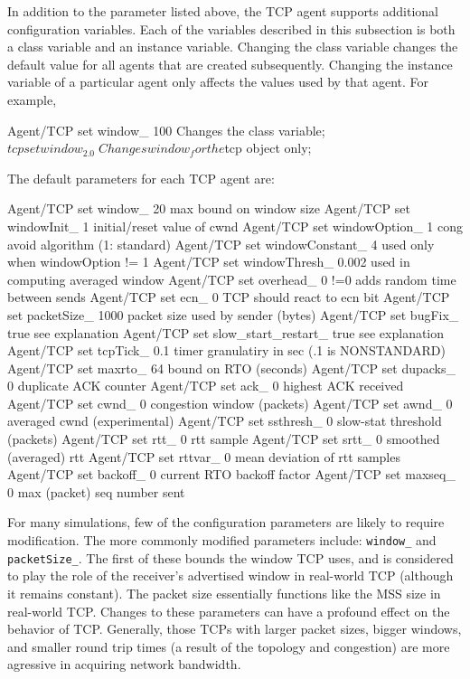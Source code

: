 \documentclass{article}
\begin{document}
In addition to the  parameter listed above,
the TCP agent supports additional configuration variables.
Each of the variables described in this subsection is
both a class variable and an instance variable.
Changing the class variable changes the default value
for all agents that are created subsequently.
Changing the instance variable of a particular agent
only affects the values used by that agent.
For example,
\begin{program}
  \>Agent/TCP set window_ 100     \; Changes the class variable;
  \>$tcp set window_ 2.0          \; Changes window_ for the $tcp object only;
\end{program}

The default parameters for each TCP agent are:
\begin{program}
Agent/TCP set window_   20              \; max bound on window size
Agent/TCP set windowInit_ 1             \; initial/reset value of cwnd
Agent/TCP set windowOption_ 1           \; cong avoid algorithm (1: standard)
Agent/TCP set windowConstant_ 4         \; used only when windowOption != 1
Agent/TCP set windowThresh_ 0.002       \; used in computing averaged window
Agent/TCP set overhead_ 0               \; !=0 adds random time between sends
Agent/TCP set ecn_ 0                    \; TCP should react to ecn bit 
Agent/TCP set packetSize_ 1000          \; packet size used by sender (bytes)
Agent/TCP set bugFix_ true              \; see explanation
Agent/TCP set slow_start_restart_ true  \; see explanation
Agent/TCP set tcpTick_ 0.1              \; timer granulatiry in sec (.1 is NONSTANDARD)
Agent/TCP set maxrto_ 64                \; bound on RTO (seconds)
Agent/TCP set dupacks_ 0                \; duplicate ACK counter
Agent/TCP set ack_ 0                    \; highest ACK received
Agent/TCP set cwnd_ 0                   \; congestion window (packets)
Agent/TCP set awnd_ 0                   \; averaged cwnd (experimental)
Agent/TCP set ssthresh_ 0               \; slow-stat threshold (packets)
Agent/TCP set rtt_ 0                    \; rtt sample
Agent/TCP set srtt_ 0                   \; smoothed (averaged) rtt
Agent/TCP set rttvar_ 0                 \; mean deviation of rtt samples
Agent/TCP set backoff_ 0                \; current RTO backoff factor
Agent/TCP set maxseq_ 0                 \; max (packet) seq number sent

\end{program}

For many simulations, few of the configuration parameters are likely
to require modification.
The more commonly modified parameters include: {\tt window\_} and
{\tt packetSize\_}.
The first of these bounds the window TCP uses, and is considered
to play the role of the receiver's advertised window in real-world
TCP (although it remains constant).
The packet size essentially functions like the MSS size in real-world
TCP.
Changes to these parameters can have a profound effect on the behavior
of TCP.
Generally, those TCPs with larger packet sizes, bigger windows, and
smaller round trip times (a result of the topology and congestion) are
more agressive in acquiring network bandwidth.
\end{document}
